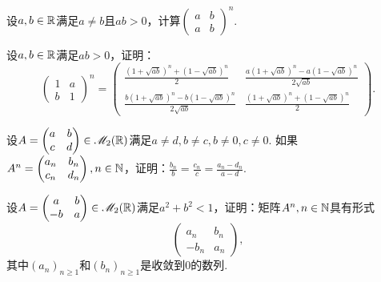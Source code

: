 \begin{problem}[L型矩阵的$n$次幂.]
  设$a,b\in\mathbb R$满足$a\ne b$且$ab>0$，计算$\begin{pmatrix}
    a & b \\
    a & b
  \end{pmatrix}^n$.
\end{problem}

\begin{mybox}
  \begin{problem}
    设$a,b\in\mathbb R$满足$ab>0$，证明：
    \[
      \begin{pmatrix}
        1 & a \\
        b & 1
      \end{pmatrix}^n = \begin{pmatrix}
        \frac{(1+\sqrt{ab})^n+(1-\sqrt{ab})^n}2
        & \frac{a(1+\sqrt{ab})^n-a(1-\sqrt{ab})^n}
        {2\sqrt{ab}} \\
        \frac{b(1+\sqrt{ab})^n-b(1-\sqrt{ab})^n}
        {2\sqrt{ab}} & \frac{(1+\sqrt{ab})^n+(1-\sqrt{ab})^n}2
      \end{pmatrix}.
    \]
  \end{problem}
\end{mybox}

\begin{problem}
  设$A=\begin{pmatrix}
    a & b \\
    c & d
  \end{pmatrix}\in\mathscr M_2(\mathbb R)$满足$a\ne d,b\ne c,b\ne 0,c\ne0$. 如果$A^n=\begin{pmatrix}
    a_n & b_n \\
    c_n & d_n
  \end{pmatrix},n\in\mathbb N$，证明：$\frac{b_n}b=\frac{c_n}c=\frac{a_n-d_n}{a-d}$.
\end{problem}

\begin{problem}
  设$A=\begin{pmatrix}
    a & b \\
    -b & a
  \end{pmatrix}\in\mathscr M_2(\mathbb R)$满足$a^2+b^2<1$，证明：矩阵$A^n,n\in\mathbb N$具有形式
  \[
    \begin{pmatrix}
      a_n & b_n \\
      -b_n & a_n
    \end{pmatrix},
  \]
  其中$(a_n)_{n\ge1}$和$(b_n)_{n\ge1}$是收敛到0的数列.
\end{problem}

